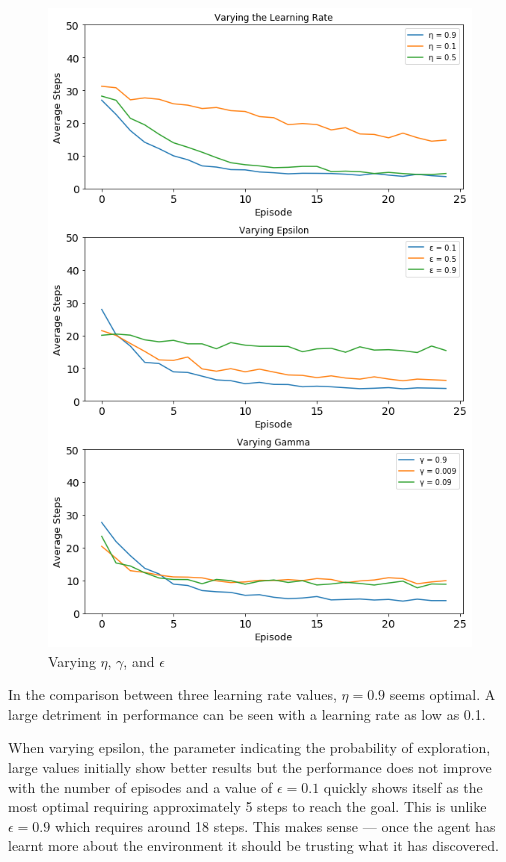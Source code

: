 \documentclass[11pt,journal,transmag,final]{IEEEtran}
\begin{document}
    \begin{figure}
        \begin{center}
            \includegraphics[width=\linewidth,keepaspectratio]{figures/varying-parameters.png}
            \caption{Varying $\eta$, $\gamma$, and $\epsilon$}
            \label{fig:varying-params:comparison}
        \end{center}
    \end{figure}

    In the comparison between three learning rate values, $\eta = 0.9$ seems optimal. A large detriment in performance can be seen with a learning rate as low as 0.1.

    When varying epsilon, the parameter indicating the probability of exploration, large values initially show better results but the performance does not improve with the number of episodes and a value of $\epsilon = 0.1$ quickly shows itself as the most optimal requiring approximately 5 steps to reach the goal. This is unlike $\epsilon = 0.9$ which requires around 18 steps. This makes sense --- once the agent has learnt more about the environment it should be trusting what it has discovered.
\end{document}
